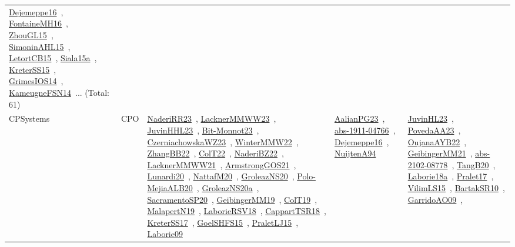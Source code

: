{\begin{longtable}{lp{3cm}>{\raggedright\arraybackslash}p{6cm}>{\raggedright\arraybackslash}p{6cm}>{\raggedright\arraybackslash}p{8cm}}
\href{works/Dejemeppe16.pdf}{Dejemeppe16}~\cite{Dejemeppe16}, \href{works/FontaineMH16.pdf}{FontaineMH16}~\cite{FontaineMH16}, \href{works/ZhouGL15.pdf}{ZhouGL15}~\cite{ZhouGL15}, \href{works/SimoninAHL15.pdf}{SimoninAHL15}~\cite{SimoninAHL15}, \href{works/LetortCB15.pdf}{LetortCB15}~\cite{LetortCB15}, \href{works/Siala15a.pdf}{Siala15a}~\cite{Siala15a}, \href{works/KreterSS15.pdf}{KreterSS15}~\cite{KreterSS15}, \href{works/GrimesIOS14.pdf}{GrimesIOS14}~\cite{GrimesIOS14}, \href{works/KameugneFSN14.pdf}{KameugneFSN14}~\cite{KameugneFSN14}... (Total: 61)\\
CPSystems & CPO & \href{works/NaderiRR23.pdf}{NaderiRR23}~\cite{NaderiRR23}, \href{works/LacknerMMWW23.pdf}{LacknerMMWW23}~\cite{LacknerMMWW23}, \href{works/JuvinHHL23.pdf}{JuvinHHL23}~\cite{JuvinHHL23}, \href{works/Bit-Monnot23.pdf}{Bit-Monnot23}~\cite{Bit-Monnot23}, \href{works/CzerniachowskaWZ23.pdf}{CzerniachowskaWZ23}~\cite{CzerniachowskaWZ23}, \href{works/WinterMMW22.pdf}{WinterMMW22}~\cite{WinterMMW22}, \href{works/ZhangBB22.pdf}{ZhangBB22}~\cite{ZhangBB22}, \href{works/ColT22.pdf}{ColT22}~\cite{ColT22}, \href{works/NaderiBZ22.pdf}{NaderiBZ22}~\cite{NaderiBZ22}, \href{works/LacknerMMWW21.pdf}{LacknerMMWW21}~\cite{LacknerMMWW21}, \href{works/ArmstrongGOS21.pdf}{ArmstrongGOS21}~\cite{ArmstrongGOS21}, \href{works/Lunardi20.pdf}{Lunardi20}~\cite{Lunardi20}, \href{works/NattafM20.pdf}{NattafM20}~\cite{NattafM20}, \href{works/GroleazNS20.pdf}{GroleazNS20}~\cite{GroleazNS20}, \href{works/Polo-MejiaALB20.pdf}{Polo-MejiaALB20}~\cite{Polo-MejiaALB20}, \href{works/GroleazNS20a.pdf}{GroleazNS20a}~\cite{GroleazNS20a}, \href{works/SacramentoSP20.pdf}{SacramentoSP20}~\cite{SacramentoSP20}, \href{works/GeibingerMM19.pdf}{GeibingerMM19}~\cite{GeibingerMM19}, \href{works/ColT19.pdf}{ColT19}~\cite{ColT19}, \href{works/MalapertN19.pdf}{MalapertN19}~\cite{MalapertN19}, \href{works/LaborieRSV18.pdf}{LaborieRSV18}~\cite{LaborieRSV18}, \href{works/CappartTSR18.pdf}{CappartTSR18}~\cite{CappartTSR18}, \href{works/KreterSS17.pdf}{KreterSS17}~\cite{KreterSS17}, \href{works/GoelSHFS15.pdf}{GoelSHFS15}~\cite{GoelSHFS15}, \href{works/PraletLJ15.pdf}{PraletLJ15}~\cite{PraletLJ15}, \href{works/Laborie09.pdf}{Laborie09}~\cite{Laborie09} & \href{works/AalianPG23.pdf}{AalianPG23}~\cite{AalianPG23}, \href{works/abs-1911-04766.pdf}{abs-1911-04766}~\cite{abs-1911-04766}, \href{works/Dejemeppe16.pdf}{Dejemeppe16}~\cite{Dejemeppe16}, \href{works/NuijtenA94.pdf}{NuijtenA94}~\cite{NuijtenA94} & \href{works/JuvinHL23.pdf}{JuvinHL23}~\cite{JuvinHL23}, \href{works/PovedaAA23.pdf}{PovedaAA23}~\cite{PovedaAA23}, \href{works/OujanaAYB22.pdf}{OujanaAYB22}~\cite{OujanaAYB22}, \href{works/GeibingerMM21.pdf}{GeibingerMM21}~\cite{GeibingerMM21}, \href{works/abs-2102-08778.pdf}{abs-2102-08778}~\cite{abs-2102-08778}, \href{works/TangB20.pdf}{TangB20}~\cite{TangB20}, \href{works/Laborie18a.pdf}{Laborie18a}~\cite{Laborie18a}, \href{works/Pralet17.pdf}{Pralet17}~\cite{Pralet17}, \href{works/VilimLS15.pdf}{VilimLS15}~\cite{VilimLS15}, \href{works/BartakSR10.pdf}{BartakSR10}~\cite{BartakSR10}, \href{works/GarridoAO09.pdf}{GarridoAO09}~\cite{GarridoAO09}, 
\end{longtable}}
